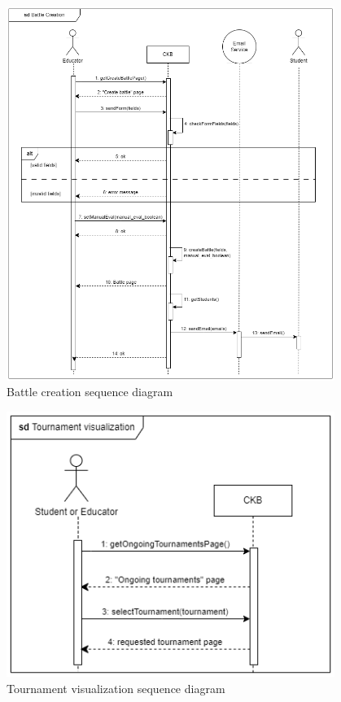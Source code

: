 \begin{figure}[H]
    \centering
    \includegraphics[width=0.95\textwidth]{images/seq_diagrams/battle_creation.png}
    \caption{Battle creation sequence diagram}
    \label{fig:sequence_diagram}
\end{figure}
\clearpage

\begin{figure}[H]
    \centering
    \includegraphics[width=0.95\textwidth]{images/seq_diagrams/tournament_visualization.png}
    \caption{Tournament visualization sequence diagram}
    \label{fig:sequence_diagram}
\end{figure}
\clearpage

